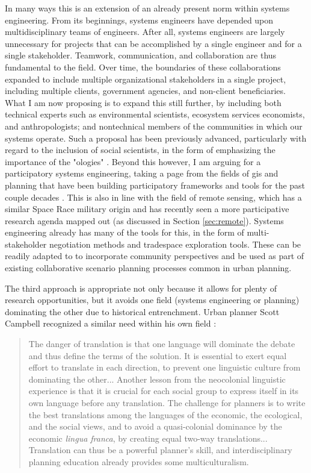 In many ways this is an extension of an already present norm within systems engineering. From its beginnings, systems engineers have depended upon multidisciplinary teams of engineers. After all, systems engineers are largely unnecessary for projects that can be accomplished by a single engineer and for a single stakeholder. Teamwork, communication, and collaboration are thus fundamental to the field. Over time, the boundaries of these collaborations expanded to include multiple organizational stakeholders in a single project, including multiple clients, government agencies, and non-client beneficiaries. What I am now proposing is to expand this still further, by including both technical experts such as environmental scientists, ecosystem services economists, and anthropologists; and nontechnical members of the communities in which our systems operate. Such a proposal has been previously advanced, particularly with regard to the inclusion of social scientists, in the form of emphasizing the importance of the "ologies" \cite{donaldsonPraiseOlogiesDiscussion2017}. Beyond this however, I am arguing for a participatory systems engineering, taking a page from the fields of \ac{gis} and planning that have been building participatory frameworks and tools for the past couple decades \cite{kimCriticalCartographyParticipatory2015,
pertParticipatoryDevelopmentNew2013,
sieberPublicParticipationGeographic2006,
talenBottomUpGIS2000,
ulibarriCollaborativeModelDevelopment2018}. This is also in line with the field of remote sensing, which has a similar Space Race military origin and has recently seen a more participative research agenda mapped out \cite{bennettPoliticsPixelsReview2022} (as discussed in Section \ref{sec:remote}). Systems engineering already has many of the tools for this, in the form of multi-stakeholder negotiation methods and tradespace exploration tools. These can be readily adapted to to incorporate community perspectives and be used as part of existing collaborative scenario planning processes common in urban planning.

The third approach is appropriate not only because it allows for plenty of research opportunities, but it avoids one field (systems engineering or planning) dominating the other due to historical entrenchment. Urban planner Scott Campbell recognized a similar need within his own field \cite{campbellGreenCitiesGrowing2016}:

\blockquote{The danger of translation is that one language will dominate the debate and thus define the terms of the solution. It is essential to exert equal effort to translate in each direction, to prevent one linguistic culture from dominating the other... Another lesson from the neocolonial linguistic experience is that it is crucial for each social group to express itself in its own language before any translation. The challenge for planners is to write the best translations among the languages of the economic, the ecological, and the social views, and to avoid a quasi-colonial dominance by the economic \textit{lingua franca}, by creating equal two-way translations... Translation can thus be a powerful planner's skill, and interdisciplinary planning education already provides some multiculturalism.}


